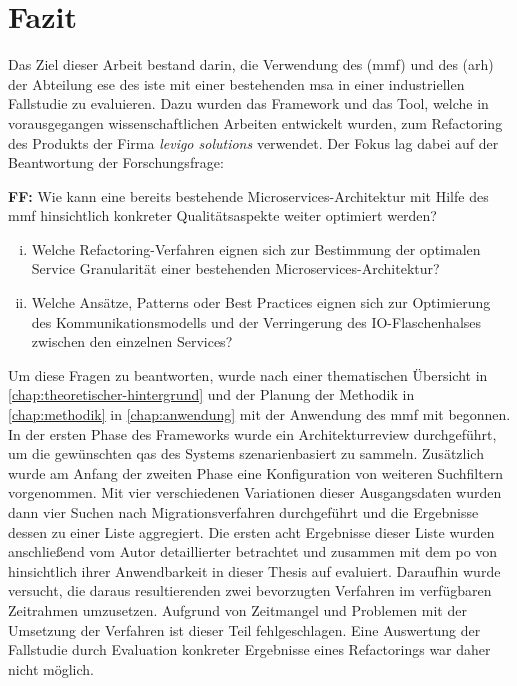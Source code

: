 \chapter{Fazit}
\label{chap:fazit}

Das Ziel dieser Arbeit bestand darin, die Verwendung des  (\acrshort{mmf}) und des  (\acrshort{arh}) der Abteilung \acrfull{ese} des \acrfull{iste} mit einer bestehenden \acrfull{msa} in einer industriellen Fallstudie zu evaluieren.
Dazu wurden das Framework und das Tool, welche in vorausgegangen wissenschaftlichen Arbeiten entwickelt wurden, zum Refactoring des Produkts \jf der Firma \emph{levigo solutions} verwendet.
Der Fokus lag dabei auf der Beantwortung der Forschungsfrage:

\textbf{FF:} Wie kann eine bereits bestehende Microservices-Architektur mit Hilfe des \acrfull{mmf} hinsichtlich konkreter Qualitätsaspekte weiter optimiert werden?
\begin{enumerate}[i.]
	\item Welche Refactoring-Verfahren eignen sich zur Bestimmung der optimalen Service Granularität einer bestehenden Microservices-Architektur?
	\item Welche Ansätze, Patterns oder Best Practices eignen sich zur Optimierung des Kom\-mu\-ni\-ka\-tions\-mo\-dells und der Verringerung des IO-Flaschenhalses zwischen den einzelnen Services?
\end{enumerate}
Um diese Fragen zu beantworten, wurde nach einer thematischen Übersicht in \cref{chap:theoretischer-hintergrund} und der Planung der Methodik in \cref{chap:methodik} in \cref{chap:anwendung} mit der Anwendung des \gls{mmf} mit \jf begonnen.
In der ersten Phase des Frameworks wurde ein Architekturreview durchgeführt, um die gewünschten \glspl{qa} des Systems szenarienbasiert zu sammeln.
Zusätzlich wurde am Anfang der zweiten Phase eine Konfiguration von weiteren Suchfiltern vorgenommen.
Mit vier verschiedenen Variationen dieser Ausgangsdaten wurden dann vier Suchen nach Migrationsverfahren durchgeführt und die Ergebnisse dessen zu einer Liste aggregiert.
Die ersten acht Ergebnisse dieser Liste wurden anschließend vom Autor detaillierter betrachtet und zusammen mit dem \gls{po} von \jf hinsichtlich ihrer Anwendbarkeit in dieser Thesis auf \jf evaluiert.
Daraufhin wurde versucht, die daraus resultierenden zwei bevorzugten Verfahren im verfügbaren Zeitrahmen umzusetzen.
Aufgrund von Zeitmangel und Problemen mit der Umsetzung der Verfahren ist dieser Teil fehlgeschlagen.
Eine Auswertung der Fallstudie durch Evaluation konkreter Ergebnisse eines Refactorings war daher nicht möglich.

